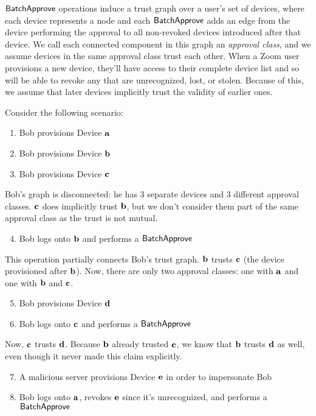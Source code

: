 $\mathsf{BatchApprove}{}$ operations induce a trust graph over a user's set of devices, where each device
represents a node and each $\mathsf{BatchApprove}{}$ adds an edge from the device performing the approval to
all non-revoked devices introduced after that device. We call each connected component in this graph
an \textit{approval class}, and we assume devices in the same approval class trust each other. When
a Zoom user provisions a new device, they'll have access to their complete device list and so will
be able to revoke any that are unrecognized, lost, or stolen. Because of this, we assume that later
devices implicitly trust the validity of earlier ones.

Consider the following scenario:
\begin{enumerate}
\item Bob provisions Device $\mathbf{a}$
\item Bob provisions Device $\mathbf{b}$
\item Bob provisions Device $\mathbf{c}$
\end{enumerate}

Bob's graph is disconnected: he has 3 separate devices and 3 different approval classes. $\mathbf{c}$
does implicitly trust $\mathbf{b}$, but we don't consider them part of the same approval class as the
trust is not mutual.

\begin{enumerate}
  \setcounter{enumi}{3}
\item Bob logs onto $\mathbf{b}$ and performs a $\mathsf{BatchApprove}{}$
\end{enumerate}

This operation partially connects Bob's trust graph. $\mathbf{b}$ trusts $\mathbf{c}$ (the device
provisioned after $\mathbf{b}$). Now, there are only two approval classes: one with $\mathbf{a}$ and one
with $\mathbf{b}$ and $\mathbf{c}$.

\begin{enumerate}
  \setcounter{enumi}{4}
\item Bob provisions Device $\mathbf{d}$
\item Bob logs onto $\mathbf{c}$ and performs a $\mathsf{BatchApprove}{}$
\end{enumerate}

Now, $\mathbf{c}$ trusts $\mathbf{d}$. Because $\mathbf{b}$ already trusted $\mathbf{c}$, we know that
$\mathbf{b}$ trusts $\mathbf{d}$ as well, even though it never made this claim explicitly.

\begin{enumerate}
  \setcounter{enumi}{6}
\item A malicious server provisions Device $\mathbf{e}$ in order to impersonate Bob
\item Bob logs onto $\mathbf{a}$, revokes $\mathbf{e}$ since it's unrecognized, and performs a
    $\mathsf{BatchApprove}{}$
\end{enumerate}

